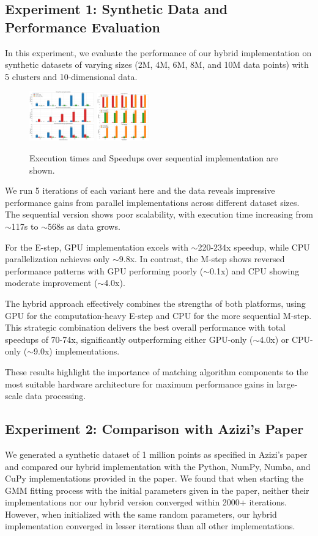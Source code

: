 \documentclass[conference]{IEEEtran}
\begin{document}
\subsection{Experiment 1: Synthetic Data and Performance Evaluation}
In this experiment, we evaluate the performance of our hybrid implementation on synthetic datasets of varying sizes (2M, 4M, 6M, 8M, and 10M data points) with 5 clusters and 10-dimensional data.
\begin{figure}[h!]
\centering
\includegraphics[width=0.25\textwidth]{executionTimes1.png}
\includegraphics[width=0.2\textwidth]{speedups.png}
\caption{Execution times and Speedups over sequential implementation are shown.}
\end{figure}
We run 5 iterations of each variant here and the data reveals impressive performance gains from parallel implementations across different dataset sizes. The sequential version shows poor scalability, with execution time increasing from $\sim$117s to $\sim$568s as data grows.

For the E-step, GPU implementation excels with $\sim$220-234x speedup, while CPU parallelization achieves only $\sim$9.8x. In contrast, the M-step shows reversed performance patterns with GPU performing poorly ($\sim$0.1x) and CPU showing moderate improvement ($\sim$4.0x).

The hybrid approach effectively combines the strengths of both platforms, using GPU for the computation-heavy E-step and CPU for the more sequential M-step. This strategic combination delivers the best overall performance with total speedups of 70-74x, significantly outperforming either GPU-only ($\sim$4.0x) or CPU-only ($\sim$9.0x) implementations.

These results highlight the importance of matching algorithm components to the most suitable hardware architecture for maximum performance gains in large-scale data processing.

\subsection{Experiment 2: Comparison with Azizi's Paper}
We generated a synthetic dataset of 1 million points as specified in Azizi's paper and compared our hybrid implementation with the Python, NumPy, Numba, and CuPy implementations provided in the paper. We found that when starting the GMM fitting process with the initial parameters given in the paper, neither their implementations nor our hybrid version converged within 2000+ iterations. However, when initialized with the same random parameters, our hybrid implementation converged in lesser iterations than all other implementations.
\end{document}

